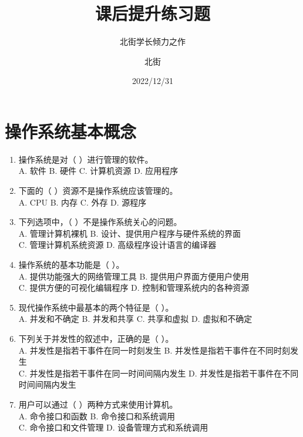 \documentclass[lang=cn,newtx,10pt,scheme=chinese]{../../elegantbook}
\title{课后提升练习题}
\subtitle{北街学长倾力之作}
\author{北街}
\date{2022/12/31}
\begin{document}
\maketitle
\frontmatter

\tableofcontents

\mainmatter

\section{操作系统基本概念}
\begin{enumerate}
  \item 操作系统是对（ ）进行管理的软件。\\
  A. 软件 \quad B. 硬件 \quad C. 计算机资源 \quad D. 应用程序

  \item 下面的（ ）资源不是操作系统应该管理的。\\
  A. CPU \quad B. 内存 \quad C. 外存 \quad D. 源程序

  \item 下列选项中，（ ）不是操作系统关心的问题。\\
  A. 管理计算机裸机 \quad B. 设计、提供用户程序与硬件系统的界面\\
  C. 管理计算机系统资源 \quad D. 高级程序设计语言的编译器

  \item 操作系统的基本功能是（ ）。\\
  A. 提供功能强大的网络管理工具 \quad B. 提供用户界面方便用户使用\\
  C. 提供方便的可视化编辑程序 \quad D. 控制和管理系统内的各种资源

  \item 现代操作系统中最基本的两个特征是（ ）。\\
  A. 并发和不确定 \quad B. 并发和共享 \quad C. 共享和虚拟 \quad D. 虚拟和不确定

  \item 下列关于并发性的叙述中，正确的是（ ）。\\
  A. 并发性是指若干事件在同一时刻发生 \quad B. 并发性是指若干事件在不同时刻发生\\
  C. 并发性是指若干事件在同一时间间隔内发生 \quad D. 并发性是指若干事件在不同时间间隔内发生

  \item 用户可以通过（ ）两种方式来使用计算机。\\
  A. 命令接口和函数 \quad B. 命令接口和系统调用\\
  C. 命令接口和文件管理 \quad D. 设备管理方式和系统调用


\end{enumerate}
\end{document}
